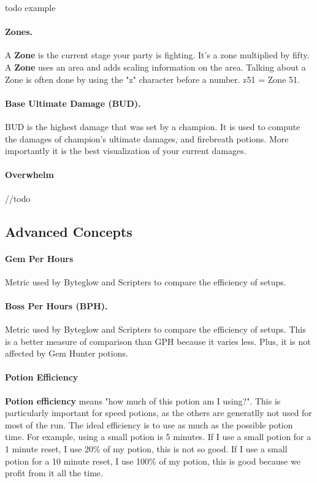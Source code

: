 \documentclass{article}
\begin{document}
todo example
\paragraph{Zones.}
A \textbf{Zone} is the current stage your party is fighting.
It's a zone multiplied by fifty.
A \textbf{Zone} uses an area and adds scaling information on the area.
Talking about a Zone is often done by using the "z" character before a number.
z51 = Zone 51.

\paragraph{Base Ultimate Damage (BUD).}

BUD is the highest damage that was set by a champion.
It is used to compute the damages of champion's ultimate damages, and firebreath potions.
More importantly it is the best visualization of your current damages.


\paragraph{Overwhelm}

//todo

\subsection{Advanced Concepts}

\paragraph{Gem Per Hours}

Metric used by Byteglow and Scripters to compare the efficiency of setups.

\paragraph{Boss Per Hours (BPH).}

Metric used by Byteglow and Scripters to compare the efficiency of setups.
This is a better measure of comparison than GPH because it varies less.
Plus, it is not affected by Gem Hunter potions.

\paragraph{Potion Efficiency}

\textbf{Potion efficiency} means "how much of this potion am I using?".
This is particularly important for speed potions, as the others are generatlly not used for most of the run.
The ideal efficiency is to use as much as the possible potion time.
For example, using a small potion is 5 minutes.
If I use a small potion for a 1 minute reset, I use 20\% of my potion, this is not so good.
If I use a small potion for a 10 minute reset, I use 100\% of my potion, this is good because we profit from it all the time.
\end{document}
